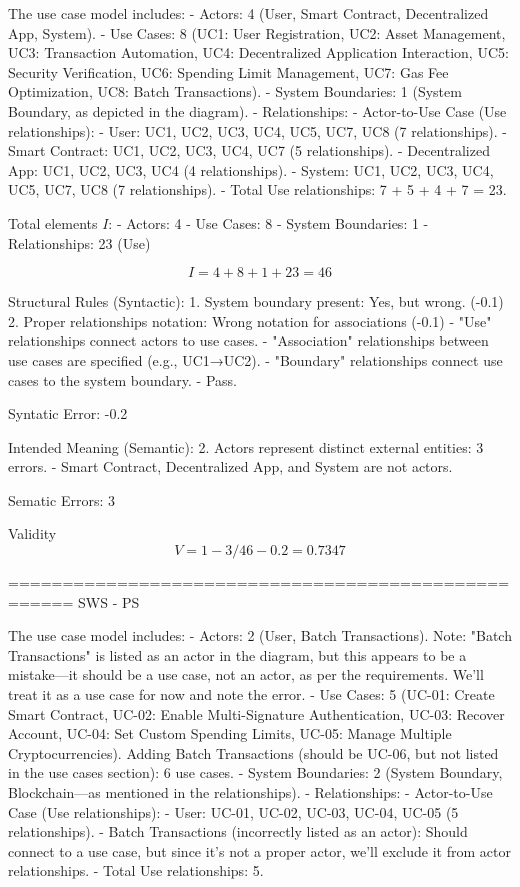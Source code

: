 The use case model includes:
- Actors: 4 (User, Smart Contract, Decentralized App, System).
- Use Cases: 8 (UC1: User Registration, UC2: Asset Management, UC3: Transaction Automation, UC4: Decentralized Application Interaction, UC5: Security Verification, UC6: Spending Limit Management, UC7: Gas Fee Optimization, UC8: Batch Transactions).
- System Boundaries: 1 (System Boundary, as depicted in the diagram).
- Relationships:
- Actor-to-Use Case (Use relationships):
- User: UC1, UC2, UC3, UC4, UC5, UC7, UC8 (7 relationships).
- Smart Contract: UC1, UC2, UC3, UC4, UC7 (5 relationships).
- Decentralized App: UC1, UC2, UC3, UC4 (4 relationships).
- System: UC1, UC2, UC3, UC4, UC5, UC7, UC8 (7 relationships).
- Total Use relationships: 7 + 5 + 4 + 7 = 23.

Total elements \( I \):
- Actors: 4
- Use Cases: 8
- System Boundaries: 1
- Relationships: 23 (Use) 

\[
I = 4 + 8 + 1 + 23 = 46
\]

Structural Rules (Syntactic):
1. System boundary present: Yes, but wrong. (-0.1)
2. Proper relationships notation: Wrong notation for associations (-0.1)
- "Use" relationships connect actors to use cases.
- "Association" relationships between use cases are specified (e.g., UC1→UC2).
- "Boundary" relationships connect use cases to the system boundary.
- Pass.

Syntatic Error: -0.2

Intended Meaning (Semantic):
2. Actors represent distinct external entities: 3 errors.
- Smart Contract, Decentralized App, and System are not actors. 

Sematic Errors: 3

Validity
\[
V =1 - 3/46 - 0.2 = 0.7347
\]

====================================================
SWS - PS

The use case model includes:
- Actors: 2 (User, Batch Transactions). Note: "Batch Transactions" is listed as an actor in the diagram, but this appears to be a mistake—it should be a use case, not an actor, as per the requirements. We’ll treat it as a use case for now and note the error.
- Use Cases: 5 (UC-01: Create Smart Contract, UC-02: Enable Multi-Signature Authentication, UC-03: Recover Account, UC-04: Set Custom Spending Limits, UC-05: Manage Multiple Cryptocurrencies). Adding Batch Transactions (should be UC-06, but not listed in the use cases section): 6 use cases.
- System Boundaries: 2 (System Boundary, Blockchain—as mentioned in the relationships).
- Relationships:
- Actor-to-Use Case (Use relationships):
- User: UC-01, UC-02, UC-03, UC-04, UC-05 (5 relationships).
- Batch Transactions (incorrectly listed as an actor): Should connect to a use case, but since it’s not a proper actor, we’ll exclude it from actor relationships.
- Total Use relationships: 5.

